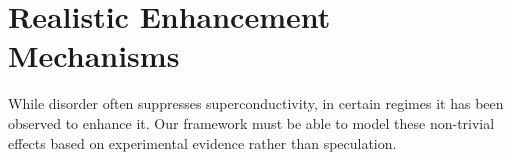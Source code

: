 \section{Realistic Enhancement Mechanisms}
While disorder often suppresses superconductivity, in certain regimes it has been observed to enhance it. Our framework must be able to model these non-trivial effects based on experimental evidence rather than speculation.



